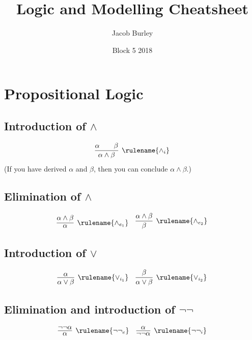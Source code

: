 \documentclass{article}
\title{Logic and Modelling Cheatsheet}
\author{Jacob Burley}
\date{Block 5 2018}
\begin{document}
\maketitle

\section{Propositional Logic}

\subsection{Introduction of $\wedge$}
    \begin{align*}
      \infer[\rulename{\wedge_i}]
      {\alpha \wedge \beta}
      {\alpha && \beta}
    \end{align*}
    (If you have derived $\alpha$ and $\beta$, then you can conclude $\alpha \wedge \beta$.)
\subsection{Elimination of $\wedge$}
    \begin{align*}
      \infer[\rulename{\wedge_{e_1}}]
      {\alpha}
      {\alpha \wedge \beta}
      &&
      \infer[\rulename{\wedge_{e_2}}]
      {\beta}
      {\alpha \wedge \beta}
    \end{align*}

\subsection{Introduction of $\vee$}
    \begin{align*}
      \infer[\rulename{\vee_{i_1}}]
      {\alpha \vee \beta}
      {\alpha}
      &&
      \infer[\rulename{\vee_{i_2}}]
      {\alpha \vee \beta}
      {\beta}
    \end{align*}
    
\subsection{Elimination and introduction of $\neg\neg$}
    \begin{align*}
      \infer[\rulename{\neg\neg_e}]
      {\alpha}
      {\neg\neg\alpha}
      &&
      \infer[\rulename{\neg\neg_i}]
      {\neg\neg\alpha}
      {\alpha}
    \end{align*}
    
\end{document}
